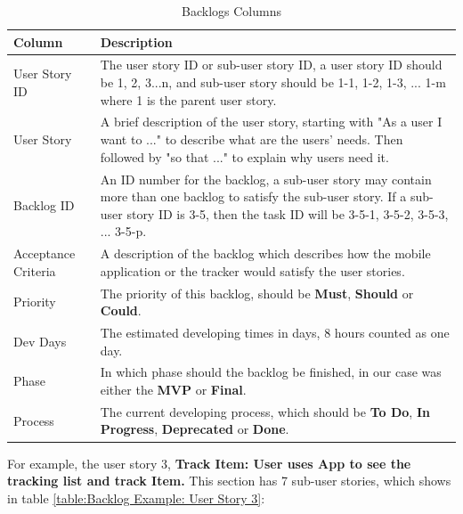 \documentclass[12pt,a4paper]{article}
\begin{document}
          \begin{table}[H]
            \centering
              \begin{tabularx}{\textwidth}{l X}
                \hline
                Column & Description  \\ \hline
                User Story ID & The user story ID or sub-user story ID, a user story ID should be 1, 2, 3...n, and sub-user story should be 1-1, 1-2, 1-3, ... 1-m  where 1 is the parent user story.\\ 
                User Story & A brief description of the user story, starting with "As a user I want to ..." to describe what are the users' needs. Then followed by "so that ..." to explain why users need it. \\ 
                Backlog ID & An ID number for the backlog, a sub-user story may contain more than one backlog to satisfy the sub-user story. If a sub-user story ID is  3-5, then the task ID will be 3-5-1, 3-5-2, 3-5-3, ... 3-5-p.  \\ 
                Acceptance Criteria & A description of the backlog which describes how the mobile application or the tracker would satisfy the user stories. \\ 
                Priority & The priority of this backlog, should be {\bf Must}, {\bf Should} or {\bf Could}. \\                  
                Dev Days & The estimated developing times in days, 8 hours counted as one day. \\                  
                Phase & In which phase should the backlog be finished, in our case was either the {\bf MVP} or {\bf Final}. \\                  
                Process & The current developing process, which should be {\bf To Do}, {\bf In Progress}, {\bf Deprecated} or {\bf Done}.  \\                  
                \hline
              \end{tabularx}
              \caption[Table caption text]{Backlogs Columns}
              \label{table:Backlogs Column}
          \end{table}
          
          For example, the user story 3, {\bf Track Item: User uses App to see the tracking list and track Item.} This section has 7 sub-user stories, which shows in table \ref{table:Backlog Example: User Story 3}: 
          
\end{document}
